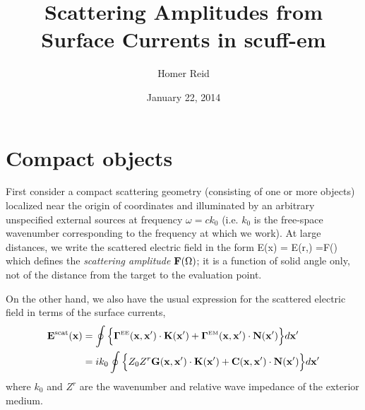 \documentclass[letterpaper]{article}
\title {Scattering Amplitudes from Surface Currents in {\sc scuff-em}}
\author {Homer Reid}
\date {January 22, 2014}
\begin{document}
\pagestyle{myheadings}
\maketitle

\tableofcontents

\newpage 
\section{Compact objects}

First consider a compact scattering geometry (consisting of one or 
more objects) localized near the origin of coordinates and illuminated 
by an arbitrary unspecified external sources at frequency 
$\omega=ck_0$ (i.e. $k_0$ is the free-space wavenumber corresponding
to the frequency at which we work). At large distances, we write the 
scattered electric field in the form
{\vb E(\vb x) = 
   \vb E(r,\Omega)
   =\vb F(\Omega) 
}
which defines the \textit{scattering amplitude}
$\mathbf{F}(\Omega)$; it is a function of solid angle only,
not of the distance from the target to the evaluation point.

On the other hand, we also have the usual expression
for the scattered electric field in terms of the surface
currents,
\begin{align*}
 \mathbf{E}^{\hbox{\scriptsize{scat}}}(\mathbf{x})
&=\oint \Big\{ \boldsymbol{\Gamma}^{\hbox{\tiny{EE}}}(\mathbf{x},\mathbf{x}^\prime)\cdot \mathbf{K}(\mathbf{x}^\prime)
              +\boldsymbol{\Gamma}^{\hbox{\tiny{EM}}}(\mathbf{x},\mathbf{x}^\prime)\cdot \mathbf{N}(\mathbf{x}^\prime)
        \Big\}d\mathbf{x}^\prime
\\
&=ik_0\oint \Big\{ Z_0 Z^r\mathbf{G}(\mathbf{x},\mathbf{x}^\prime)\cdot \mathbf{K}(\mathbf{x}^\prime)
                 +\mathbf{C}(\mathbf{x},\mathbf{x}^\prime)\cdot \mathbf{N}(\mathbf{x}^\prime)
        \Big\}d\mathbf{x}^\prime
\end{align*}
where $k_0$ and $Z^r$ are the wavenumber and relative wave impedance 
of the exterior medium.

\newpage
\end{document}
